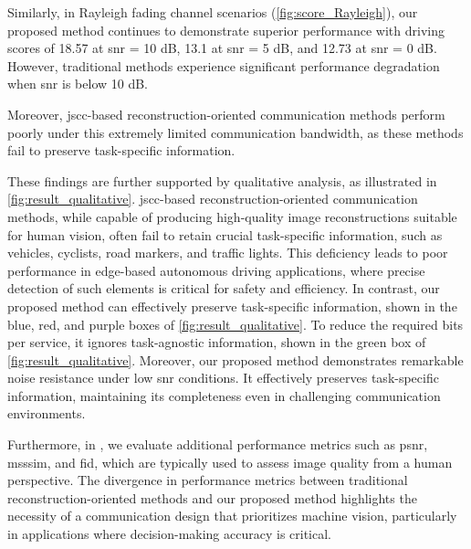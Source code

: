 Similarly, in Rayleigh fading channel scenarios (\cref{fig:score_Rayleigh}), our proposed method continues to demonstrate superior performance with driving scores of 18.57 at \gls{snr} = 10 dB, 13.1 at \gls{snr} = 5 dB, and 12.73 at \gls{snr} = 0 dB. However, traditional methods experience significant performance degradation when \gls{snr} is below 10 dB.

Moreover, \gls{jscc}-based reconstruction-oriented communication methods perform poorly under this extremely limited communication bandwidth, as these methods fail to preserve task-specific information.

These findings are further supported by qualitative analysis, as illustrated in \cref{fig:result_qualitative}. \gls{jscc}-based reconstruction-oriented communication methods, while capable of producing high-quality image reconstructions suitable for human vision, often fail to retain crucial task-specific information, such as vehicles, cyclists, road markers, and traffic lights. This deficiency leads to poor performance in edge-based autonomous driving applications, where precise detection of such elements is critical for safety and efficiency. In contrast, our proposed method can effectively preserve task-specific information, shown in the blue, red, and purple boxes of \cref{fig:result_qualitative}. To reduce the required bits per service, it ignores task-agnostic information, shown in the green box of \cref{fig:result_qualitative}.
Moreover, our proposed method demonstrates remarkable noise resistance under low \gls{snr} conditions. It effectively preserves task-specific information, maintaining its completeness even in challenging communication environments.

Furthermore, in , we evaluate additional performance metrics such as \gls{psnr}, \gls{msssim}, and \gls{fid}, which are typically used to assess image quality from a human perspective. The divergence in performance metrics between traditional reconstruction-oriented methods and our proposed method highlights the necessity of a communication design that prioritizes machine vision, particularly in applications where decision-making accuracy is critical.




